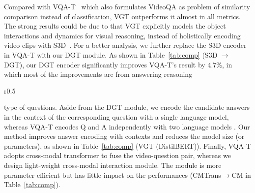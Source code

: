 \documentclass[runningheads]{llncs}
\begin{document}
Compared with VQA-T~\cite{yang2021just} which also formulates VideoQA as problem of similarity comparison instead of classification, VGT outperforms it almost in all metrics. The strong results could be due to that VGT explicitly models the object interactions and dynamics for visual reasoning, instead of holistically encoding video clips with S3D~\cite{miech2020end,xie2018rethinking}. 
For a better analysis, we further replace the S3D encoder in VQA-T with our DGT module. As shown in Table~\ref{tab:comp} (S3D $\rightarrow$ DGT), our DGT encoder significantly improves VQA-T's result by 4.7\%, in which most of the improvements are from answering reasoning
\setlength{\tabcolsep}{1pt}
\begin{wraptable}[7]{r}{0.5\textwidth}
\vspace{-10pt}
\small
\caption{Detailed comparison with VQA-T \cite{yang2021just}. CMTrans: Cross-Modal Transformer.}\label{tab:comp}
\vspace{4pt}
\end{wraptable}
type of questions.  
Aside from the DGT module, we encode the candidate answers in the context of the corresponding question with a single language model, whereas VQA-T encodes Q and A independently with two language models \cite{sanh2019distilbert}.  
Our method improves answer encoding with contexts and reduces the model size (or parameters), as shown in Table~\ref{tab:comp} (VGT (DistilBERT)).
Finally, VQA-T adopts cross-modal transformer to fuse the video-question pair, whereas we design light-weight cross-modal interaction module. The module is more parameter efficient but has little impact on the performances (CMTrans$\rightarrow$CM in Table~\ref{tab:comp}).
\end{document}
